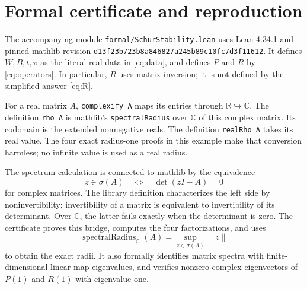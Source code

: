 \documentclass[11pt]{article}
\newcommand{\R}{\mathbb R}
\newcommand{\C}{\mathbb C}
\begin{document}
\section{Formal certificate and reproduction}
The accompanying module \texttt{formal/SchurStability.lean} uses Lean 4.34.1
and pinned mathlib revision
\texttt{d13f23b723b8a846827a245b89c10fc7d3f11612}.
It defines $W,B,t,\pi$ as the literal real data in \eqref{eq:data}, and defines
$P$ and $R$ by \eqref{eq:operators}. In particular, $R$ uses matrix inversion;
it is not defined by the simplified answer \eqref{eq:R}.

For a real matrix $A$, \texttt{complexify A} maps its entries through
$\R\hookrightarrow\C$. The definition \texttt{rho A} is mathlib's
\texttt{spectralRadius} over $\C$ of this complex matrix. Its codomain is
the extended nonnegative reals. The definition \texttt{realRho A} takes
its real value. The four exact radius-one proofs in this example make
that conversion harmless; no infinite value is used as a real radius.

The spectrum calculation is connected to mathlib by the equivalence
\[
 z\in\sigma(A)\quad\Longleftrightarrow\quad \det(zI-A)=0
\]
for complex matrices. The library definition characterizes the left side
by noninvertibility; invertibility of a matrix is equivalent to
invertibility of its determinant. Over $\C$, the latter fails exactly when
the determinant is zero. The certificate proves this bridge, computes the
four factorizations, and uses
\[
 \operatorname{spectralRadius}_{\C}(A)
 =\sup_{z\in\sigma(A)}\|z\|
\]
to obtain the exact radii. It also formally identifies matrix spectra with
finite-dimensional linear-map eigenvalues, and verifies nonzero complex
eigenvectors of $P(1)$ and $R(1)$ with eigenvalue one.
\end{document}
